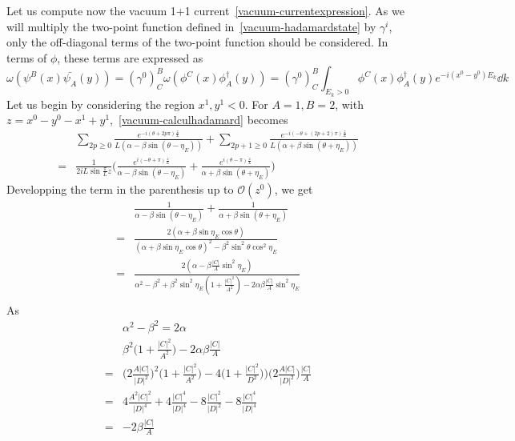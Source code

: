 Let us compute now the vacuum 1+1 current~\cref{vacuum-currentexpression}.
As we will multiply the two-point function defined in~\cref{vacuum-hadamardstate} by $\gamma^i$, 
only the off-diagonal terms of the two-point function should be considered.
In terms of $\phi$, these terms are expressed as
\begin{equation}\label{vacuum-calculhadamard}
\omega(\psi^B(x) \bar{\psi_A}(y)) = 
(\gamma^0)^B_C \omega(\phi^C(x) \phi^\dagger_A(y)) = (\gamma^0)^B_C
\int_{E_k > 0} \phi^C(x) \phi^\dagger_A(y) e^{-i(x^0 - y^0) E_k} \dd k
\end{equation}
Let us begin by considering the region $x^1, y^1 < 0$. 
For $A =1, B= 2$, with $z =x^0 - y^0 - x^1 +y^1$,~\cref{vacuum-calculhadamard} becomes
\begin{equation*}
\begin{split}
& \sum_{2p \geq 0} \frac{e^{-i(\theta + 2p\pi)\frac{z}{L}}}{L(\alpha - \beta \sin (\theta - \eta_E))} 
+ \sum_{2p+1 \geq 0} \frac{e^{-i(- \theta + (2p+2)\pi)\frac{z}{L}}}{L(\alpha + \beta \sin (\theta + \eta_E))}\\
%
=& 
\frac{1}{2i L\sin\frac{\pi}{L}z} \bigg( \frac{e^{i(-\theta + \pi)\frac{z}{L}}}{\alpha - \beta \sin (\theta - \eta_E)}
+ \frac{e^{i(\theta - \pi) \frac{z}{L}}}{\alpha + \beta \sin (\theta + \eta_E)}
\bigg)
\end{split}
\end{equation*}
Developping the term in the parenthesis up to $\mathcal{O}(z^0)$, we get
\begin{equation}
\begin{split}
& \frac{1}{\alpha - \beta \sin (\theta - \eta_E)}
   + \frac{1}{\alpha + \beta \sin (\theta + \eta_E)} \\
= & \frac{2(\alpha + \beta \sin \eta_E \cos \theta)}{(\alpha + \beta \sin \eta_E \cos \theta)^2 - \beta^2 \sin^2 \theta \cos^2 \eta_E} \\
= & \frac{2(\alpha - \beta \frac{|C|}{A} \sin^2 \eta_E)}{\alpha^2 - \beta^2 + \beta^2 \sin^2 \eta_E (1 + \frac{|C|^2}{A^2}) - 2 \alpha \beta \frac{|C|}{A} \sin^2 \eta_E} \\
\end{split}
\end{equation}
As
\begin{equation*}
\begin{split}
& \alpha^2 - \beta ^ 2 = 2 \alpha \\
&  \beta^2 \big(1 + \frac{|C|^2}{A^2} \big) - 2 \alpha \beta \frac{|C|}{A} \\
= & \big(2\frac{A |C|}{|D|^2} \big)^2 \big( 1+ \frac{|C|^2}{A^2} \big) - 4\big( 1+ \frac{|C|^2}{D^2}))\big(2\frac{A |C|}{|D|^2} \big) \frac{|C|}{A}  \\
= & 4 \frac{A^2 |C|^2}{|D|^4} + 4\frac{|C|^4}{|D|^4} - 8\frac{|C|^2}{|D|^2} - 8\frac{|C|^4}{|D|^4} \\
= & -2 \beta \frac{|C|}{A}
\end{split}
\end{equation*}
